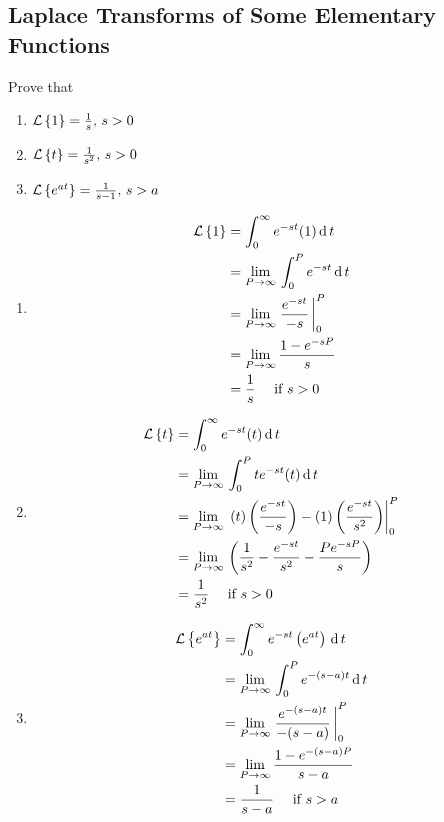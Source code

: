 \documentclass[../main-sheet.tex]{subfiles}
\begin{document}
\subsection{Laplace Transforms of Some Elementary Functions}
\begin{prob}
    Prove that 
    \begin{enumerate}[label={(\alph*)}]
        \item $ \mathcal{L}\left\{ 1\right\}=\frac{1}{s},\,s>0 $
        \item $ \mathcal{L}\left\{ t\right\}=\frac{1}{s^2},\,s>0 $
        \item $ \mathcal{L}\left\{ e^{at}\right\}=\frac{1}{s-1},\,s>a $
    \end{enumerate}
\end{prob}
\begin{soln}
    \begin{enumerate}[label={(\alph*)}]
        \item \begin{align*}
            \mathcal{L}\left\{ 1\right\}&=\int_0^\infty e^{-st}(1)\,\mathrm{d}\, t\\
            &=\lim\limits_{P\to \infty}\,\int_0^P e^{-st}\,\mathrm{d}\, t\\
            &=\lim\limits_{P\to \infty}\left.\frac{e^{-st}}{-s}\,\right\vert_0^P\\
            &=\lim\limits_{P\to \infty}\frac{1-e^{-sP}}{s}\\
            &=\frac{1}{s}\quad \text{ if } s>0
        \end{align*}
        \item \begin{align*}
            \mathcal{L}\left\{ t\right\}&=\int_0^\infty e^{-st}(t)\,\mathrm{d}\, t\\
            &=\lim\limits_{P\to \infty}\,\int_0^P te^{-st}(t)\,\mathrm{d}\, t\\
            &=\lim\limits_{P\to \infty}\,\left.(t)\left( \frac{e^{-st}}{-s} \right)-(1)\left( \frac{e^{-st}}{s^2} \right)\right\vert_0^P\\
            &=\lim\limits_{P\to \infty}\,\left(\frac{1}{s^2}-\frac{e^{-st}}{s^2}-\frac{Pe^{-sP}}{s} \right)\\
            &=\frac{1}{s^2}\quad \text{ if } s>0
        \end{align*}
        \item \begin{align*}
            \mathcal{L}\left\{ e^{at}\right\}&=\int_0^\infty e^{-st}\left( e^{at} \right)\,\mathrm{d}\, t\\
            &=\lim\limits_{P\to \infty}\,\int_0^P e^{-(s-a)t}\,\mathrm{d}\, t\\
            &=\lim\limits_{P\to \infty}\left.\frac{e^{-(s-a)t}}{-(s-a)}\,\right\vert_0^P\\
            &=\lim\limits_{P\to \infty}\frac{1-e^{-(s-a)P}}{s-a}\\
            &=\frac{1}{s-a}\quad \text{ if } s>a
        \end{align*}
    \end{enumerate}
\end{soln}
\end{document}
